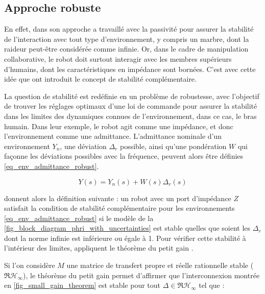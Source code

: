 \subsection{Approche robuste} \label{chap5_sec_litterature_sub_robust}

En effet, dans son approche \textcite{lamy_conception_2011} a travaillé avec la passivité pour assurer la stabilité de l'interaction avec tout type d'environnement, y compris un marbre, dont la raideur peut-être considérée comme infinie. Or, dans le cadre de manipulation collaborative, le robot doit surtout interagir avec les membres supérieurs d'humains, dont les caractéristiques en impédance sont bornées. C'est avec cette idée que \textcite{buerger_complementary_2007} ont introduit le concept de stabilité complémentaire.

La question de stabilité est redéfinie en un problème de robustesse, avec l’objectif de trouver les réglages optimaux d’une loi de commande pour assurer la stabilité dans les limites des dynamiques connues de l’environnement, dans ce cas, le bras humain. Dans leur exemple, le robot agit comme une impédance, et donc l'environnement comme une admittance. L'admittance nominale d'un environnement $Y_n$, une déviation $\Delta_r$ possible, ainsi qu'une pondération $W$ qui façonne les déviations possibles avec la fréquence, peuvent alors être définies \cref{eq_env_admittance_robust}.

\begin{equation} \label{eq_env_admittance_robust}
	Y(s) = Y_n(s) + W(s)\Delta_r(s)
\end{equation}

\textcite{buerger_relaxing_2006} donnent alors la définition suivante : un robot avec un port d'impédance $Z$ satisfait la condition de stabilité complémentaire pour les environnements \cref{eq_env_admittance_robust} si le modèle de la \cref{fig_block_diagram_phri_with_uncertainties} est stable quelles que soient les $\Delta_r$ dont la norme infinie est inférieure ou égale à 1. Pour vérifier cette stabilité à l'intérieur des limites, \textcite{buerger_relaxing_2006} appliquent le théorème du petit gain \parencite[Chapitre~9.2]{zhou_robust_1995}.

\tikzexternalenable


Si l'on considère $M$ une matrice de transfert propre et réelle rationnelle stable ($\Re\mathcal{H}_\infty$), le théorème du petit gain permet d'affirmer que l'interconnexion montrée en \cref{fig_small_gain_theorem} est stable pour tout $\Delta \in \Re\mathcal{H}_\infty$ tel que :

